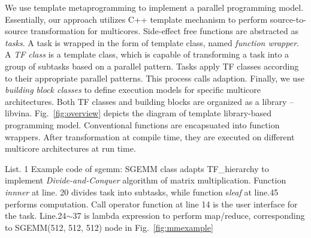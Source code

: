 We use template metaprogramming to implement a parallel programming model.
Essentially, our approach utilizes C++ template mechanism to
perform source-to-source transformation for multicores. Side-effect
free functions are abstracted as \textit{tasks}. A task is
wrapped in the form of template class, named \emph{function
  wrapper}.  A \textit{TF class} is a template class, which
is capable of transforming a task into a group of subtasks based on
a parallel pattern. Tasks
apply TF classes according to their appropriate
parallel patterns. This process calls adaption. 
Finally, we use \textit{building block classes} to define execution models
for specific multicore architectures. Both TF classes and building
blocks are organized as a library --
libvina. Fig.~\ref{fig:overview} depicts the diagram of template
library-based programming model. Conventional functions are
encapsuated into function wrappers. After transformation at compile time, they are
executed on different multicore architectures at run time.

\renewcommand\linenumberfont{\normalfont\small}
\setlength\linenumbersep{-0.06in}





\makebox[3.4in]{\hrulefill}

List. 1 Example code of sgemm: SGEMM class adapts TF\_hierarchy
to implement \emph{Divide-and-Conquer} algorithm of matrix
multiplication. Function \textit{innner} at
line. 20 divides task into subtasks, while function s\textit{leaf} at line.45 performs
computation. Call operator function at line 14 is the user interface for the task.
Line.24$\sim$37 is lambda expression to perform map/reduce, corresponding to
SGEMM(512, 512, 512) node in Fig.~\ref{fig:mmexample}\\

\makebox[3.4in]{\hrulefill}

